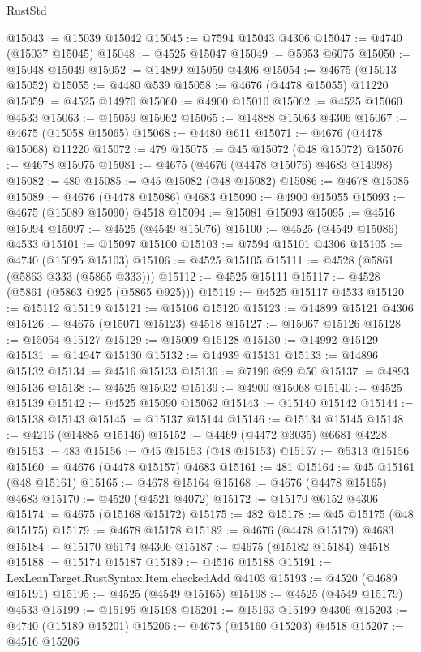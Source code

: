 \begin{lexlean}{RustStd}
\begin{coremodule}
@15043 := @15039 @15042
@15045 := @7594 @15043 @4306
@15047 := @4740 (@15037 @15045)
@15048 := @4525 @15047
@15049 := @5953 @6075
@15050 := @15048 @15049
@15052 := @14899 @15050 @4306
@15054 := @4675 (@15013 @15052)
@15055 := @4480 @539
@15058 := @4676 (@4478 @15055) @11220
@15059 := @4525 @14970
@15060 := @4900 @15010
@15062 := @4525 @15060 @4533
@15063 := @15059 @15062
@15065 := @14888 @15063 @4306
@15067 := @4675 (@15058 @15065)
@15068 := @4480 @611
@15071 := @4676 (@4478 @15068) @11220
@15072 := 479
@15075 := @45 @15072 (@48 @15072)
@15076 := @4678 @15075
@15081 := @4675 (@4676 (@4478 @15076) @4683 @14998)
@15082 := 480
@15085 := @45 @15082 (@48 @15082)
@15086 := @4678 @15085
@15089 := @4676 (@4478 @15086) @4683
@15090 := @4900 @15055
@15093 := @4675 (@15089 @15090) @4518
@15094 := @15081 @15093
@15095 := @4516 @15094
@15097 := @4525 (@4549 @15076)
@15100 := @4525 (@4549 @15086) @4533
@15101 := @15097 @15100
@15103 := @7594 @15101 @4306
@15105 := @4740 (@15095 @15103)
@15106 := @4525 @15105
@15111 := @4528 (@5861 (@5863 @333 (@5865 @333)))
@15112 := @4525 @15111
@15117 := @4528 (@5861 (@5863 @925 (@5865 @925)))
@15119 := @4525 @15117 @4533
@15120 := @15112 @15119
@15121 := @15106 @15120
@15123 := @14899 @15121 @4306
@15126 := @4675 (@15071 @15123) @4518
@15127 := @15067 @15126
@15128 := @15054 @15127
@15129 := @15009 @15128
@15130 := @14992 @15129
@15131 := @14947 @15130
@15132 := @14939 @15131
@15133 := @14896 @15132
@15134 := @4516 @15133
@15136 := @7196 @99 @50
@15137 := @4893 @15136
@15138 := @4525 @15032
@15139 := @4900 @15068
@15140 := @4525 @15139
@15142 := @4525 @15090 @15062
@15143 := @15140 @15142
@15144 := @15138 @15143
@15145 := @15137 @15144
@15146 := @15134 @15145
@15148 := @4216 (@14885 @15146)
@15152 := @4469 (@4472 @3035) @6681 @4228
@15153 := 483
@15156 := @45 @15153 (@48 @15153)
@15157 := @5313 @15156
@15160 := @4676 (@4478 @15157) @4683
@15161 := 481
@15164 := @45 @15161 (@48 @15161)
@15165 := @4678 @15164
@15168 := @4676 (@4478 @15165) @4683
@15170 := @4520 (@4521 @4072)
@15172 := @15170 @6152 @4306
@15174 := @4675 (@15168 @15172)
@15175 := 482
@15178 := @45 @15175 (@48 @15175)
@15179 := @4678 @15178
@15182 := @4676 (@4478 @15179) @4683
@15184 := @15170 @6174 @4306
@15187 := @4675 (@15182 @15184) @4518
@15188 := @15174 @15187
@15189 := @4516 @15188
@15191 := LexLeanTarget.RustSyntax.Item.checkedAdd @4103
@15193 := @4520 (@4689 @15191)
@15195 := @4525 (@4549 @15165)
@15198 := @4525 (@4549 @15179) @4533
@15199 := @15195 @15198
@15201 := @15193 @15199 @4306
@15203 := @4740 (@15189 @15201)
@15206 := @4675 (@15160 @15203) @4518
@15207 := @4516 @15206

\end{coremodule}
\end{lexlean}
